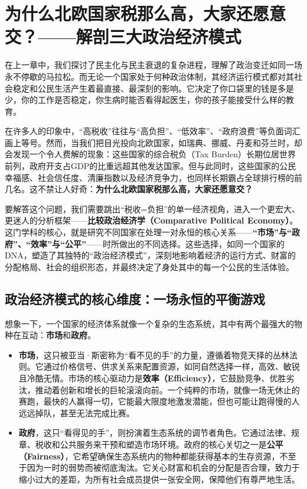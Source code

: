 \chapter{为什么北欧国家税那么高，大家还愿意交？——解剖三大政治经济模式}

在上一章中，我们探讨了民主化与民主衰退的复杂进程，理解了政治变迁如同一场永不停歇的马拉松。而无论一个国家处于何种政治体制，其经济运行模式都对其社会稳定和公民生活产生着最直接、最深刻的影响。它决定了你口袋里的钱是多是少，你的工作是否稳定，你生病时能否看得起医生，你的孩子能接受什么样的教育。

在许多人的印象中，“高税收”往往与“高负担”、“低效率”、“政府浪费”等负面词汇画上等号。然而，当我们把目光投向北欧国家，如瑞典、挪威、丹麦和芬兰时，却会发现一个令人费解的现象：这些国家的综合税负（Tax Burden）长期位居世界前列，政府开支占GDP的比重远超其他发达国家。但与此同时，这些国家的公民幸福感、社会信任度、清廉指数以及经济竞争力，也同样长期霸占全球排行榜的前几名。这不禁让人好奇：\textbf{为什么北欧国家税那么高，大家还愿意交？}

要解答这个问题，我们需要跳出“税收=负担”的单一经济视角，进入一个更宏大、更迷人的分析框架——\textbf{比较政治经济学（Comparative Political Economy）}。这门学科的核心，就是研究不同国家在处理一对永恒的核心关系——\textbf{“市场”与“政府”、“效率”与“公平”}——时所做出的不同选择。这些选择，如同一个国家的DNA，塑造了其独特的“政治经济模式”，深刻地影响着经济的运行方式、财富的分配格局、社会的组织形态，并最终决定了身处其中的每一个公民的生活体验。

\section{政治经济模式的核心维度：一场永恒的平衡游戏}

想象一下，一个国家的经济体系就像一个复杂的生态系统，其中有两个最强大的物种在互动：\textbf{市场}和\textbf{政府}。

\begin{itemize}
\item \textbf{市场}，这只被亚当·斯密称为“看不见的手”的力量，遵循着物竞天择的丛林法则。它通过价格信号、供求关系来配置资源，如同自然选择一样，高效、敏锐且冷酷无情。市场的核心驱动力是\textbf{效率（Efficiency）}，它鼓励竞争、优胜劣汰，推动着创新和增长的巨轮滚滚向前。一个纯粹的市场，就像一场无休止的赛跑，最快的人赢得一切，它能最大限度地激发潜能，但也可能让跑得慢的人远远掉队，甚至无法完成比赛。
\item \textbf{政府}，这只“看得见的手”，则扮演着生态系统的调节者角色。它通过法律、规章、税收和公共服务来干预和塑造市场环境。政府的核心关切之一是\textbf{公平（Fairness）}，它希望确保生态系统内的物种都能获得基本的生存资源，不至于因为一时的弱势而被彻底淘汰。它关心财富和机会的分配是否合理，致力于缩小过大的差距，为所有社会成员提供一张安全网，保障他们有尊严地生活。
\end{itemize}

